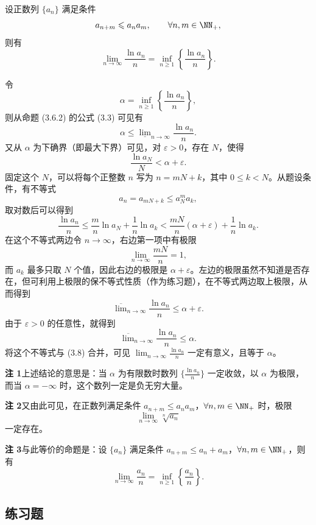\begin{xexample}[3.6.4]
设正数列 $\{a_n\}$ 满足条件
\[
  a_{n+m}\leqslant a_na_m,\qquad \forall n,m\in\NN_+,
\]
则有
\[
  \lim_{n\to\infty}\frac{\ln a_n}{n}
  =\inf_{n\geqslant1}\left\{\frac{\ln a_n}{n}\right\}.
\]
\end{xexample}
\begin{xproof}
令
\[
  \alpha=\inf_{n\geqslant1}\left\{\frac{\ln a_n}{n}\right\},
\]
则从命题 (3.6.2) 的公式 (3.3) 可见有
\begin{equation}
  \alpha\leqslant\underline{\lim}_{n\to\infty}\frac{\ln a_n}{n}.
  \tag{3.8}
  \label{eq:3.8}
\end{equation}
又从 $\alpha$ 为下确界（即最大下界）可见，对 $\varepsilon>0$，存在 $N$，使得
\[
  \frac{\ln a_N}{N}<\alpha+\varepsilon.
\]
固定这个 $N$，可以将每个正整数 $n$ 写为 $n=mN+k$，其中 $0\leqslant k<N$。从题设条件，有不等式
\[
  a_n=a_{mN+k}\leqslant a_N^ma_k,
\]
取对数后可以得到
\[
  \frac{\ln a_n}{n}
  \leqslant\frac{m}{n}\ln a_N+\frac1n\ln a_k
  <\frac{mN}{n}(\alpha+\varepsilon)+\frac1n\ln a_k.
\]
在这个不等式两边令 $n\to\infty$，右边第一项中有极限
\[
  \lim_{n\to\infty}\frac{mN}{n}=1,
\]
而 $a_k$ 最多只取 $N$ 个值，因此右边的极限是 $\alpha+\varepsilon$。左边的极限虽然不知道是否存在，但可利用上极限的保不等式性质（作为练习题），在不等式两边取上极限，从而得到
\[
  \overline{\lim}_{n\to\infty}\frac{\ln a_n}{n}\leqslant\alpha+\varepsilon.
\]
由于 $\varepsilon>0$ 的任意性，就得到
\[
  \overline{\lim}_{n\to\infty}\frac{\ln a_n}{n}\leqslant\alpha.
\]
将这个不等式与 (3.8) 合并，可见 $\lim_{n\to\infty}\frac{\ln a_n}{n}$ 一定有意义，且等于 $\alpha$。
\end{xproof}

\begin{xremark}
\textbf{注 1}\quad 上述结论的意思是：当 $\alpha$ 为有限数时数列 $\{\frac{\ln a_n}{n}\}$ 一定收敛，以 $\alpha$ 为极限，而当 $\alpha=-\infty$ 时，这个数列一定是负无穷大量。

\textbf{注 2}\quad 又由此可见，在正数列满足条件 $a_{n+m}\leqslant a_na_m$，$\forall n,m\in\NN_+$ 时，极限
\[
  \lim_{n\to\infty}\sqrt[n]{a_n}
\]
一定存在。

\textbf{注 3}\quad 与此等价的命题是：设 $\{a_n\}$ 满足条件 $a_{n+m}\leqslant a_n+a_m$，$\forall n,m\in\NN_+$，则有
\[
  \lim_{n\to\infty}\frac{a_n}{n}
  =\inf_{n\geqslant1}\left\{\frac{a_n}{n}\right\}.
\]
\end{xremark}

\subsection{练习题}

